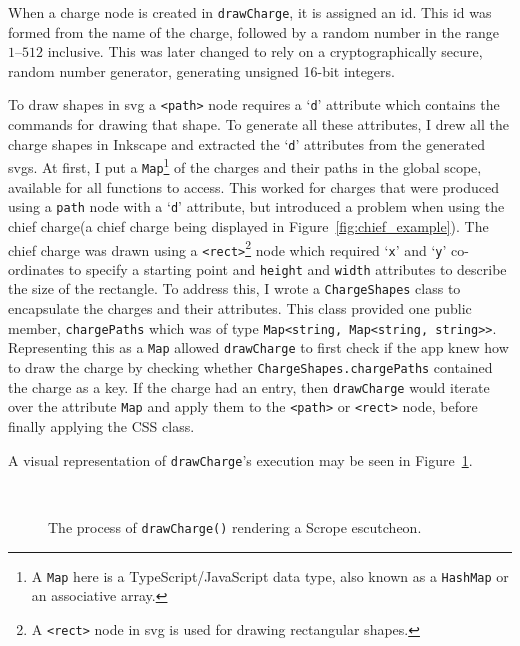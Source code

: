 \documentclass[nobib, a4paper, twoside, justified]{tufte-book}
\makeatletter
\newcommand{\svg}{\gls{svg}\@\xspace}
\newcommand{\svgs}{\glspl{svg}\@\xspace}
\newcommand{\charge}{\gls{charge}\@\xspace}
\newcommand{\charges}{\glspl{charge}\@\xspace}
\makeatother
\begin{document}
When a \charge node is created in \texttt{drawCharge}, it is assigned an id. This id was formed
from the name of the charge, followed by a random number in the range $1\text{--}512$ inclusive.
This was later changed to rely on a cryptographically secure, random number generator, generating
unsigned 16-bit integers.

To draw shapes in \svg a \texttt{<path>} node requires a `\texttt{d}' attribute which contains the
commands for drawing that shape. To generate all these attributes, I drew all the \charge shapes in
Inkscape and extracted the `\texttt{d}' attributes from the generated \svgs. At first, I put a
\texttt{Map}\footnote{A \texttt{Map} here is a TypeScript/JavaScript data type, also known as a
\texttt{HashMap} or an associative array.} of the \charges and their paths in the global scope,
available for all functions to access. This worked for \charges that were produced using a
\texttt{path} node with a `\texttt{d}' attribute, but introduced a problem when using the chief
\charge (a chief \charge being displayed in Figure~\ref{fig:chief_example}). The chief \charge was
drawn using a \texttt{<rect>}\footnote{A \texttt{<rect>} node in \svg is used for drawing
rectangular shapes.} node which required `\texttt{x}' and `\texttt{y}' co-ordinates to specify a
starting point and \texttt{height} and \texttt{width} attributes to describe the size of the
rectangle. To address this, I wrote a \texttt{ChargeShapes} class to encapsulate the \charges and
their attributes. This class provided one public member, \texttt{chargePaths} which was of type
\texttt{Map<string, Map<string, string>\hphantom{}>}.  Representing this as a \texttt{Map} allowed
\texttt{drawCharge} to first check if the app knew how to draw the \charge by checking whether
\texttt{ChargeShapes.chargePaths} contained the \charge as a key.  If the \charge had an entry,
then \texttt{drawCharge} would iterate over the attribute \texttt{Map} and apply them to the
\texttt{<path>} or \texttt{<rect>} node, before finally applying the CSS class.

A visual representation of \texttt{drawCharge}'s execution may be seen in
Figure~\ref{fig:draw_charge}.

\begin{figure}
  \centering
  \qquad
  \\
  \qquad
  \caption{The process of \texttt{drawCharge()} rendering a Scrope \gls{escutcheon}.}%
  \label{fig:draw_charge}
\end{figure}
\end{document}
